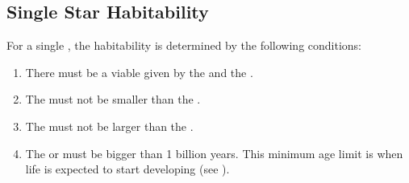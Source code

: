 \documentclass[letterpaper,10pt,english]{sphinxmanual}
\begin{document}
\subsection{Single Star Habitability}
\label{\detokenize{quantities/habitability/single_star_habitability:single-star-habitability}}\label{\detokenize{quantities/habitability/single_star_habitability::doc}}\label{\detokenize{quantities/habitability/single_star_habitability:id1}}
\sphinxAtStartPar
For a single {\hyperref[\detokenize{celestial_bodies/star:id1}]{}}, the habitability is determined by the following conditions:
\begin{enumerate}
%
\item {} 
\sphinxAtStartPar
There must be a viable {\hyperref[\detokenize{quantities/habitability/habitable_zones/single_star_habitable_zone:id1}]{}} given by the {\hyperref[\detokenize{quantities/insolation_models/relaxed_minimum_limit:id1}]{}} and the {\hyperref[\detokenize{quantities/insolation_models/relaxed_maximum_limit:id1}]{}}.

\item {} 
\sphinxAtStartPar
The {\hyperref[\detokenize{quantities/insolation_models/relaxed_maximum_limit:id1}]{}} must not be smaller than the {\hyperref[\detokenize{quantities/children_orbit_limits/inner_orbit_limit:id1}]{}}.

\item {} 
\sphinxAtStartPar
The {\hyperref[\detokenize{quantities/insolation_models/relaxed_minimum_limit:id1}]{}} must not be larger than the {\hyperref[\detokenize{quantities/children_orbit_limits/outer_orbit_limit:id1}]{}}.

\item {} 
\sphinxAtStartPar
The {\hyperref[\detokenize{quantities/life/lifetime:id1}]{}} or {\hyperref[\detokenize{quantities/life/age:id1}]{}}  must be bigger than 1 billion years. This minimum age limit is when life is expected to start developing (see ).

\end{enumerate}
\end{document}

